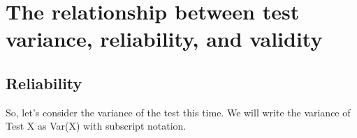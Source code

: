 \documentclass{ltjbook}
\begin{document}
\section{The relationship between test variance, reliability, and validity}
\subsection{Reliability}

So, let's consider the variance of the test this time. We will write the variance of Test X as Var(X) with subscript notation.
\end{document}
